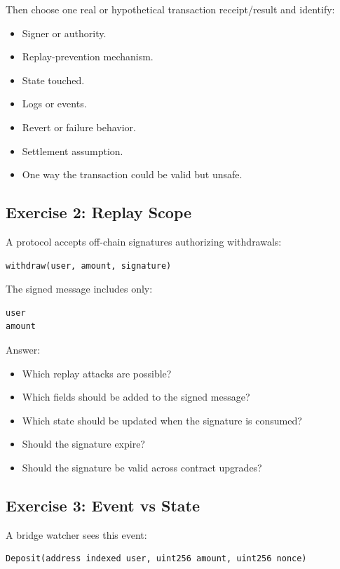Then choose one real or hypothetical transaction receipt/result and
identify:

\begin{itemize}
\tightlist
\item
  Signer or authority.
\item
  Replay-prevention mechanism.
\item
  State touched.
\item
  Logs or events.
\item
  Revert or failure behavior.
\item
  Settlement assumption.
\item
  One way the transaction could be valid but unsafe.
\end{itemize}

\subsection{Exercise 2: Replay Scope}

A protocol accepts off-chain signatures authorizing withdrawals:

\begin{lstlisting}
withdraw(user, amount, signature)
\end{lstlisting}

The signed message includes only:

\begin{lstlisting}
user
amount
\end{lstlisting}

Answer:

\begin{itemize}
\tightlist
\item
  Which replay attacks are possible?
\item
  Which fields should be added to the signed message?
\item
  Which state should be updated when the signature is consumed?
\item
  Should the signature expire?
\item
  Should the signature be valid across contract upgrades?
\end{itemize}

\subsection{Exercise 3: Event vs State}

A bridge watcher sees this event:

\begin{lstlisting}
Deposit(address indexed user, uint256 amount, uint256 nonce)
\end{lstlisting}


